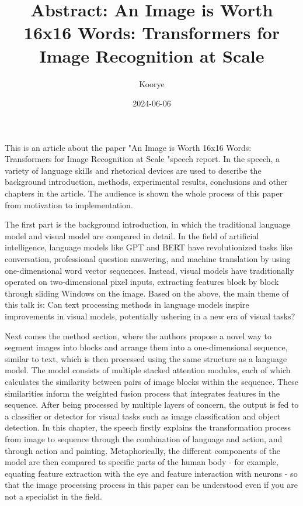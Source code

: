 \documentclass{article}
\title{Abstract: An Image is Worth 16x16 Words: Transformers for Image Recognition at Scale}
\author{Koorye}
\date{2024-06-06}
\begin{document}
\maketitle

This is an article about the paper "An Image is Worth 16x16 Words: Transformers for Image Recognition at Scale "speech report. In the speech, a variety of language skills and rhetorical devices are used to describe the background introduction, methods, experimental results, conclusions and other chapters in the article. The audience is shown the whole process of this paper from motivation to implementation.

The first part is the background introduction, in which the traditional language model and visual model are compared in detail. In the field of artificial intelligence, language models like GPT and BERT have revolutionized tasks like conversation, professional question answering, and machine translation by using one-dimensional word vector sequences. Instead, visual models have traditionally operated on two-dimensional pixel inputs, extracting features block by block through sliding Windows on the image. Based on the above, the main theme of this talk is: Can text processing methods in language models inspire improvements in visual models, potentially ushering in a new era of visual tasks?

Next comes the method section, where the authors propose a novel way to segment images into blocks and arrange them into a one-dimensional sequence, similar to text, which is then processed using the same structure as a language model. The model consists of multiple stacked attention modules, each of which calculates the similarity between pairs of image blocks within the sequence. These similarities inform the weighted fusion process that integrates features in the sequence. After being processed by multiple layers of concern, the output is fed to a classifier or detector for visual tasks such as image classification and object detection. In this chapter, the speech firstly explains the transformation process from image to sequence through the combination of language and action, and through action and painting. Metaphorically, the different components of the model are then compared to specific parts of the human body - for example, equating feature extraction with the eye and feature interaction with neurons - so that the image processing process in this paper can be understood even if you are not a specialist in the field.
\end{document}
